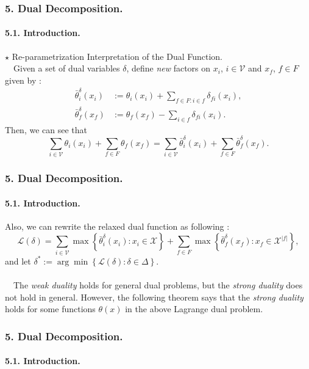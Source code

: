 \documentclass[11pt]{beamer}
\newtheorem*{pf of lemma}{\it Proof of the \normalfont \bf Lemma}
\newtheorem*{pf of claim}{\it Proof of the \normalfont \sf Claim}
\begin{document}
\begin{frame}
\frametitle{5. Dual Decomposition.}
\framesubtitle{5.1. Introduction.}
$\star$ Re-parametrization Interpretation of the Dual Function. \\ 
\ \ \indent Given a set of dual variables $\delta$, define \textit{new} factors on $x_i$, $i \in \mathcal{V}$ and $x_f$, $f \in F$ given by :
\begin{align*}
\bar{\theta}_{i}^{\delta} (x_i) &:= \theta_i (x_i) + \sum_{f \in F : i \in f} \delta_{fi}(x_i), \\
\bar{\theta}_{f}^{\delta} (x_f) &:= \theta_f (x_f) - \sum_{i \in f} \delta_{fi} (x_i).
\end{align*}
Then, we can see that
$$\sum_{i \in \mathcal{V}} \theta_i (x_i) + \sum_{f \in F} \theta_f(x_f) = \sum_{i \in \mathcal{V}} \bar{\theta}_{i}^{\delta} (x_i) + \sum_{f \in F} \bar{\theta}_{f}^{\delta} (x_f).$$

\end{frame}

\begin{frame}
\frametitle{5. Dual Decomposition.}
\framesubtitle{5.1. Introduction.}
Also, we can rewrite the relaxed dual function as following :
$$\mathcal{L} \left(\delta \right) = \sum_{i \in \mathcal{V}} \max \left\{ \bar{\theta}_{i}^{\delta} (x_i) : x_i \in \mathcal{X} \right\} + \sum_{f \in F} \max \left\{ \bar{\theta}_{f}^{\delta} (x_f) : x_f \in \mathcal{X}^{|f|} \right\},$$
and let $\delta^* := \arg \min \left\{ \mathcal{L} \left( \delta \right) : \delta \in \Delta \right\}$. \\ \ \\
\ \ \indent The \textit{weak duality} holds for general dual problems, but the \textit{strong duality} does not hold in general. However, the following theorem says that the \textit{strong duality} holds for some functions $\theta(x)$ in the above Lagrange dual problem.
\end{frame}

\begin{frame}
\frametitle{5. Dual Decomposition.}
\framesubtitle{5.1. Introduction.}

\begin{theorem} 
\end{theorem}

\end{frame}
\end{document}
